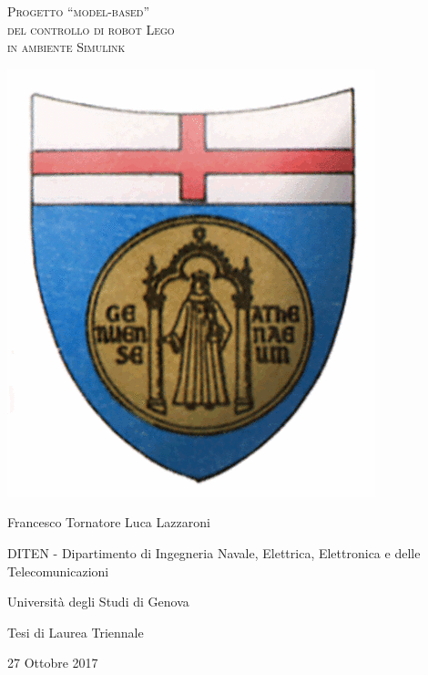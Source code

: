 \documentclass[a4paper,11pt,twoside]{book}
\begin{document}
\thispagestyle{empty}
\begin{center}
	\begin{Huge}
		\textsc{Progetto ``model-based''\\
				del controllo di robot Lego\\
				in ambiente Simulink\\}
	\end{Huge}
\end{center}
\vfill
\begin{center}
	\includegraphics[scale=0.4]{logo_unige.png}
\end{center}
\vfill
\begin{center}
	{\LARGE Francesco Tornatore Luca Lazzaroni}
\end{center}

\begin{center}
	{\Large DITEN - Dipartimento di Ingegneria Navale, Elettrica, Elettronica e delle Telecomunicazioni}
\end{center}
\begin{center}
	{\Large Università degli Studi di Genova}	
\end{center}
\vfill
\begin{center}
	Tesi di Laurea Triennale
\end{center}
\begin{center}
	27 Ottobre 2017
\end{center}
\end{document}
